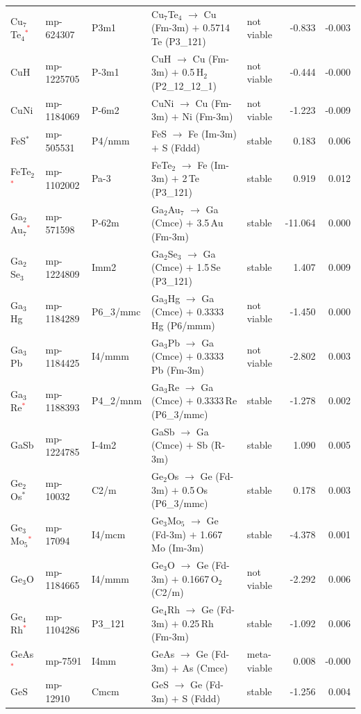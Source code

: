 \begin{longtable}{@{}ll l@{\hspace{4pt}} p{4.6cm} l@{\hspace{4pt}} rr@{}}
Cu$_{7}$Te$_{4}$\textcolor{red}{$^*$} & mp-624307 & P3m1 & Cu$_{7}$Te$_{4}$ $\to$ Cu (Fm-3m) $+$ 0.5714\,Te (P3\_121) & not viable & -0.833 & -0.003 \\
CuH & mp-1225705 & P-3m1 & CuH $\to$ Cu (Fm-3m) $+$ 0.5\,H$_{2}$ (P2\_12\_12\_1) & not viable & -0.444 & -0.000 \\
CuNi & mp-1184069 & P-6m2 & CuNi $\to$ Cu (Fm-3m) $+$ Ni (Fm-3m) & not viable & -1.223 & -0.009 \\
FeS$^*$ & mp-505531 & P4/nmm & FeS $\to$ Fe (Im-3m) $+$ S (Fddd) & stable & 0.183 & 0.006 \\
FeTe$_{2}$\textcolor{red}{$^*$} & mp-1102002 & Pa-3 & FeTe$_{2}$ $\to$ Fe (Im-3m) $+$ 2\,Te (P3\_121) & stable & 0.919 & 0.012 \\
Ga$_{2}$Au$_{7}$\textcolor{red}{$^*$} & mp-571598 & P-62m & Ga$_{2}$Au$_{7}$ $\to$ Ga (Cmce) $+$ 3.5\,Au (Fm-3m) & stable & -11.064 & 0.000 \\
Ga$_{2}$Se$_{3}$ & mp-1224809 & Imm2 & Ga$_{2}$Se$_{3}$ $\to$ Ga (Cmce) $+$ 1.5\,Se (P3\_121) & stable & 1.407 & 0.009 \\
Ga$_{3}$Hg & mp-1184289 & P6\_3/mmc & Ga$_{3}$Hg $\to$ Ga (Cmce) $+$ 0.3333\,Hg (P6/mmm) & not viable & -1.450 & 0.000 \\
Ga$_{3}$Pb & mp-1184425 & I4/mmm & Ga$_{3}$Pb $\to$ Ga (Cmce) $+$ 0.3333\,Pb (Fm-3m) & not viable & -2.802 & 0.003 \\
Ga$_{3}$Re\textcolor{red}{$^*$} & mp-1188393 & P4\_2/mnm & Ga$_{3}$Re $\to$ Ga (Cmce) $+$ 0.3333\,Re (P6\_3/mmc) & stable & -1.278 & 0.002 \\
GaSb & mp-1224785 & I-4m2 & GaSb $\to$ Ga (Cmce) $+$ Sb (R-3m) & stable & 1.090 & 0.005 \\
Ge$_{2}$Os$^*$ & mp-10032 & C2/m & Ge$_{2}$Os $\to$ Ge (Fd-3m) $+$ 0.5\,Os (P6\_3/mmc) & stable & 0.178 & 0.003 \\
Ge$_{3}$Mo$_{5}$\textcolor{red}{$^*$} & mp-17094 & I4/mcm & Ge$_{3}$Mo$_{5}$ $\to$ Ge (Fd-3m) $+$ 1.667\,Mo (Im-3m) & stable & -4.378 & 0.001 \\
Ge$_{3}$O & mp-1184665 & I4/mmm & Ge$_{3}$O $\to$ Ge (Fd-3m) $+$ 0.1667\,O$_{2}$ (C2/m) & not viable & -2.292 & 0.006 \\
Ge$_{4}$Rh\textcolor{red}{$^*$} & mp-1104286 & P3\_121 & Ge$_{4}$Rh $\to$ Ge (Fd-3m) $+$ 0.25\,Rh (Fm-3m) & stable & -1.092 & 0.006 \\
GeAs\textcolor{red}{$^*$} & mp-7591 & I4mm & GeAs $\to$ Ge (Fd-3m) $+$ As (Cmce) & meta-viable & 0.008 & -0.000 \\
GeS & mp-12910 & Cmcm & GeS $\to$ Ge (Fd-3m) $+$ S (Fddd) & stable & -1.256 & 0.004 \\

\end{longtable}
